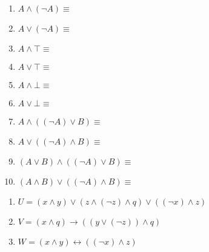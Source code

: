\documentclass{scrartcl}
\begin{document}

				\begin{multicols}{2}
				\begin{enumerate}
					\item $A \wedge (\neg A) \equiv $  
					\item $A \vee (\neg A) \equiv $  
					\item $A \wedge \top \equiv $  
					\item $A \vee \top \equiv $  
					\item $A \wedge \bot \equiv $  
					\item $A \vee \bot \equiv$
					\item $A \wedge ((\neg A) \vee B) \equiv$  
					\item $A \vee ((\neg A) \wedge B) \equiv$  
					\item $(A \vee B) \wedge ((\neg A) \vee B) \equiv$  
					\item $(A \wedge B) \vee ((\neg A) \wedge B) \equiv $  
				\end{enumerate}
				\end{multicols}


				\begin{enumerate}
					\item $U = (x \wedge y) \vee (z \wedge (\neg z) \wedge q) \vee ((\neg x) \wedge z)$
					\item $V = (x \wedge q) \rightarrow ((y \vee (\neg z)) \wedge q)$
					\item $W = (x \wedge y) \leftrightarrow ((\neg x) \wedge z)$
				\end{enumerate}
\end{document}
